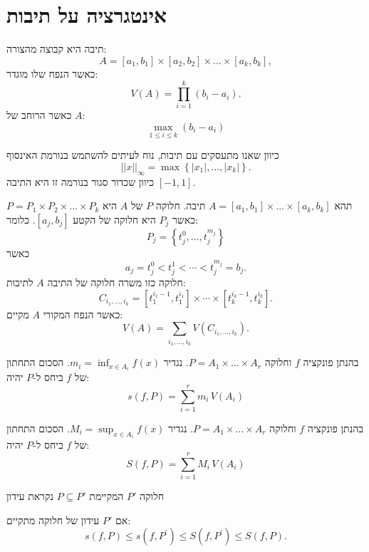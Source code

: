 \documentclass{tstextbook}
\begin{document}
\section{אינטגרציה על תיבות}

\begin{definition}[תיבה]
תיבה היא קבוצה מהצורה:
$$A=[a_{1},b_{1}]\times[a_{2},b_{2}]\times\dots\times[a_{k},b_{k}],$$
כאשר הנפח שלו מוגדר:
$$V(A)=\prod_{i=1}^{k}(b_{i}-a_{i}).$$
כאשר הרוחב של \(A\):
$$\max_{1\leq i\leq k}(b_{i}-a_{i})$$

\end{definition}
כיוון שאנו מתעסקים עם תיבות, נוח לעיתים להשתמש בנורמת האינסוף
$$||x||_{\infty}=\operatorname*{max}\left\{\left|x_{1}\right|,\ldots,\left|x_{k}\right|\right\}.$$
כיוון שכדור סגור בנורמה זו היא התיבה \([-1,1]\).

\begin{definition}[חלוקה]
תהא \(A=[a_{1},b_{1}]\times\dots \times[a_{k},b_{k}]\) תיבה. חלוקה \(P\) של \(A\) היא \(P=P_{1}\times P_{2}\times\dots \times P_{k}\)
כאשר \(P_{j}\) היא חלוקה של הקטע \([a_{j},b_{j}]\). כלומר:
$$P_{j}=\left\{  t_{j}^0,\dots,t_{j}^{m_{j}}  \right\}$$
כאשר $$a_{j}=t_{j}^{0}<t_{j}^{1}<\cdots<t_{j}^{m_{j}}=b_{j}.$$ חלוקה כזו משרה חלוקה של התיבה \(A\) לתיבות:
$$C_{i_{1},\dots,i_{k}}=[t_{1}^{i_{1}-1},t_{1}^{i_{1}}]\times\cdots\times[t_{k}^{i_{k}-1},t_{k}^{i_{k}}].$$
כאשר הנפח המקורי \(A\) מקיים:
$$V(A)=\sum_{i_{1},...,i_{k}}V(C_{i_{1},...,i_{k}}).$$

\end{definition}
\begin{definition}
בהנתן פונקציה \(f\) וחלוקה \(P=A_{1}\times\dots \times A_{r}\). נגדיר \(m_{i}=\inf_{x \in A_{i}}f(x)\). הסכום התחתון של \(f\) ביחס ל-\(P\) יהיה:
$$s(f,P)=\sum_{i=1}^{r}m_{i}\,V(A_{i})$$

\end{definition}
\begin{definition}
בהנתן פונקציה \(f\) וחלוקה \(P=A_{1}\times\dots \times A_{r}\). נגדיר \(M_{i}=\sup_{x \in A_{i}}f(x)\). הסכום התחתון של \(f\) ביחס ל-\(P\) יהיה:
$$S(f,P)=\sum_{i=1}^{r}M_{i}\,V(A_{i})$$

\end{definition}
\begin{definition}
חלוקה \(P'\) המקיימת \(P\subseteq P'\) נקראת עידון

\end{definition}
\begin{proposition}
אם \(P'\) עידון של חלוקה מתקיים:
$$s(f,P)\leq s(f,P^{\prime})\leq S\left(f,P^{\prime}\right)\leq S\left(f,P\right).$$

\end{proposition}
\end{document}
